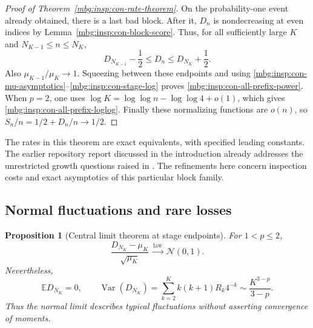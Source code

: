 \documentclass[11pt,letterpaper]{article}
\newtheorem{proposition}[theorem]{Proposition}
\theoremstyle{definition}
\newcommand{\E}{\mathbb E}
\DeclareMathOperator{\Var}{Var}
\begin{document}
\begin{proof}[Proof of Theorem~\ref{mbg:insp:con-rate-theorem}]
On the probability-one event already obtained, there is a last bad block.
After it, $D_n$ is nondecreasing at even indices by
Lemma~\ref{mbg:insp:con-block-score}.  Thus, for all sufficiently large $K$ and
$N_{K-1}\leq n\leq N_K$,
\[
 D_{N_{K-1}}-\frac12\leq D_n\leq D_{N_K}+\frac12.
\]
Also $\mu_{K-1}/\mu_K\to1$.  Squeezing between these endpoints and using
\eqref{mbg:insp:con-mu-asymptotics}--\eqref{mbg:insp:con-stage-log} proves
\eqref{mbg:insp:con-all-prefix-power}.  When $p=2$, one uses
$\log K=\log\log n-\log\log4+o(1)$, which gives
\eqref{mbg:insp:con-all-prefix-loglog}.  Finally these normalizing functions are
$o(n)$, so $S_n/n=1/2+D_n/n\to1/2$.
\end{proof}

The rates in this theorem are exact equivalents, with specified leading
constants.  The earlier repository report discussed in the introduction
already addresses the unrestricted growth questions raised in
\cite[Remark~6.8]{hat:Eldredge}.  The refinements here concern inspection costs
and exact asymptotics of this particular block family.

\subsection{Normal fluctuations and rare losses}

\begin{proposition}[Central limit theorem at stage endpoints]
\label{mbg:insp:con-clt}
For $1<p\leq2$,
\begin{equation}\label{mbg:insp:con-clt-formula}
 \frac{D_{N_K}-\mu_K}{\sqrt{\mu_K}}
 \ \xrightarrow{\mathrm{law}}\ \mathcal N(0,1).
\end{equation}
Nevertheless,
\begin{equation}\label{mbg:insp:con-actual-variance}
 \E D_{N_K}=0,
 \qquad
 \Var(D_{N_K})
 =\sum_{k=2}^{K}k(k+1)R_k4^{-k}
 \sim\frac{K^{3-p}}{3-p}.
\end{equation}
Thus the normal limit describes typical fluctuations without asserting
convergence of moments.
\end{proposition}
\end{document}
